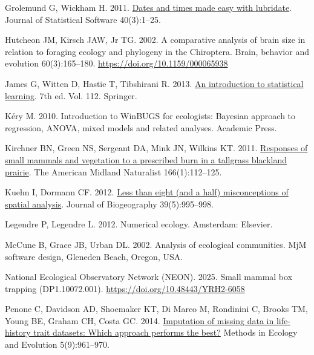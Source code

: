 \documentclass[
  13,
  letterpaper,
]{report}
\newlength{\cslhangindent}
\newenvironment{CSLReferences}[2] %
 {\begin{list}{}{%
  \setlength{\itemindent}{0pt}
  \setlength{\leftmargin}{0pt}
  \setlength{\parsep}{0pt}
  \ifodd #1
   \setlength{\leftmargin}{\cslhangindent}
   \setlength{\itemindent}{-1\cslhangindent}
  \fi
  \setlength{\itemsep}{#2\baselineskip}}}
 {\end{list}}
\begin{document}
\begin{CSLReferences}{1}{1}
Grolemund G, Wickham H. 2011.
\href{https://www.jstatsoft.org/v40/i03/}{Dates and times made easy with
{lubridate}}. Journal of Statistical Software 40(3):1--25.

Hutcheon JM, Kirsch JAW, Jr TG. 2002. A comparative analysis of brain
size in relation to foraging ecology and phylogeny in the {C}hiroptera.
Brain, behavior and evolution 60(3):165--180.
\url{https://doi.org/10.1159/000065938}

James G, Witten D, Hastie T, Tibshirani R. 2013.
\href{http://faculty.marshall.usc.edu/gareth-james/ISL/}{An introduction
to statistical learning}. 7th ed. Vol. 112. Springer.

Kéry M. 2010. Introduction to {W}in{BUGS} for ecologists: {B}ayesian
approach to regression, {ANOVA}, mixed models and related analyses.
Academic Press.

Kirchner BN, Green NS, Sergeant DA, Mink JN, Wilkins KT. 2011.
\href{https://doi.org/10.1674/0003-0031-166.1.112}{Responses of small
mammals and vegetation to a prescribed burn in a tallgrass blackland
prairie}. The American Midland Naturalist 166(1):112--125.

Kuehn I, Dormann CF. 2012.
\href{https://doi.org/10.1111/j.1365-2699.2012.02707.x}{Less than eight
(and a half) misconceptions of spatial analysis}. Journal of
Biogeography 39(5):995--998.

Legendre P, Legendre L. 2012. Numerical ecology. Amsterdam: Elsevier.

McCune B, Grace JB, Urban DL. 2002. Analysis of ecological communities.
MjM software design, Gleneden Beach, Oregon, USA.

National Ecological Observatory Network (NEON). 2025. Small mammal box
trapping (DP1.10072.001). \url{https://doi.org/10.48443/YRH2-6058}

Penone C, Davidson AD, Shoemaker KT, Di Marco M, Rondinini C, Brooks TM,
Young BE, Graham CH, Costa GC. 2014.
\href{https://doi.org/10.1111/2041-210X.12232}{Imputation of missing
data in life-history trait datasets: Which approach performs the best?}
Methods in Ecology and Evolution 5(9):961--970.


\end{CSLReferences}
\end{document}
